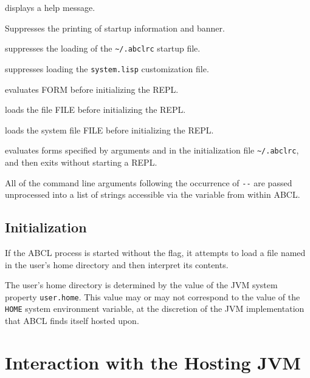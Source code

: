 \documentclass[10pt]{book}
\begin{document}
\begin{description}
\item {} displays a help message.
\item {} Suppresses the printing of startup information and banner.
\item {} suppresses the loading of the \verb+~/.abclrc+ startup file.
\item {} suppresses loading the \texttt{system.lisp} customization file. 
\item {} evaluates FORM before initializing the REPL.
\item {} loads the file FILE before initializing the REPL.
\item {} loads the system file FILE before initializing the REPL.
\item {} evaluates forms specified by arguments and in
  the initialization file \verb+~/.abclrc+, and then exits without
  starting a \textsc{REPL}.
\end{description}

All of the command line arguments following the occurrence of \verb+--+
are passed unprocessed into a list of strings accessible via the
variable  from within ABCL.

\section{Initialization}

If the \textsc{ABCL} process is started without the
 flag, it attempts to load a file
named  in the user's home directory and then interpret
its contents.

The user's home directory is determined by the value of the JVM system
property \texttt{user.home}.  This value may or may not correspond
to the value of the \texttt{HOME} system environment variable, at the
discretion of the JVM implementation that \textsc{ABCL} finds itself
hosted upon.

\chapter{Interaction with the Hosting JVM}
\end{document}
